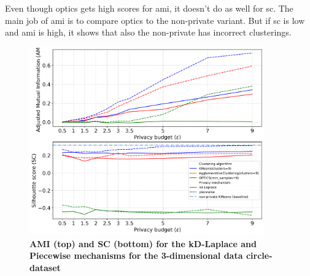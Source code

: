 Even though \gls{optics} gets high scores for \gls{ami}, it doesn't do as well for \gls{sc}. The main job of \gls{ami} is to compare \gls{optics} to the non-private variant. But if \gls{sc} is low and \gls{ami} is high, it shows that also the non-private has incorrect clusterings.
\newpage
\begin{figure}[H]
  \centering

  \caption{\textbf{AMI (top) and SC (bottom) for the kD-Laplace and Piecewise mechanisms for the 3-dimensional data circle-dataset}}
  \includegraphics[width=0.9\textwidth]{Results/nd-laplace/nd-Laplace/circle-dataset/ami-and-sc_3_dimensions.png}

  \label{fig:validation-circle-dataset_comparison_3d-laplace}
\end{figure}
